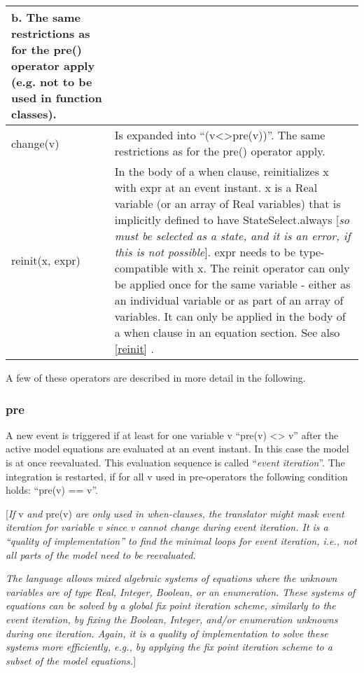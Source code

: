 \begin{longtable}{|p{5cm}|p{8cm}|}
b. The same restrictions as for the pre() operator apply (e.g. not to be
used in function classes).\\ \hline
change(v) & Is expanded into ``(v\textless{}\textgreater{}pre(v))''. The
same restrictions as for the pre() operator apply.\\ \hline
reinit(x, expr) & In the body of a when clause, reinitializes x with
expr at an event instant. x is a Real variable (or an array of Real
variables) that is implicitly defined to have StateSelect.always
{[}\emph{so} \emph{must be selected as a state, and it is an error, if
this is not possible}{]}. expr needs to be type-compatible with x. The
reinit operator can only be applied once for the same variable - either
as an individual variable or as part of an array of variables. It can
only be applied in the body of a when clause in an equation section. See
also \autoref{reinit} .\\ \hline
\end{longtable}

A few of these operators are described in more detail in the following.

\subsubsection{pre}

A new event is triggered if at least for one variable v ``pre(v)
\textless{}\textgreater{} v'' after the active model equations are
evaluated at an event instant. In this case the model is at once
reevaluated. This evaluation sequence is called ``\emph{event
iteration}''. The integration is restarted, if for all v used in
pre-operators the following condition holds: ``pre(v) == v''.

{[}\emph{If} v \emph{and} pre(v) \emph{are only used in when-clauses,
the translator might mask event iteration for variable v since v cannot
change during event iteration. It is a ``quality of implementation'' to
find the minimal loops for event iteration, i.e., not all parts of the
model need to be reevaluated. }

\emph{The language allows mixed algebraic systems of equations where the
unknown variables are of type Real, Integer, Boolean, or an enumeration.
These systems of equations can be solved by a global fix point iteration
scheme, similarly to the event iteration, by fixing the Boolean,
Integer, and/or enumeration unknowns during one iteration. Again, it is
a quality of implementation to solve these systems more efficiently,
e.g., by applying the fix point iteration scheme to a subset of the
model equations.}{]}


